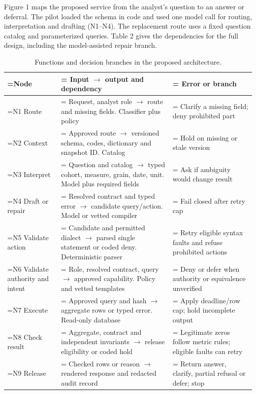 \documentclass[11pt,a4paper,onecolumn,oneside]{rho-class/rho}
\begin{document}
\label{sec:s3}

Figure 1 maps the proposed service from the analyst's question to an answer or deferral. The pilot loaded the schema in code and used one model call for routing, interpretation and drafting (N1--N4). The replacement route uses a fixed question catalog and parameterized queries. Table 2 gives the dependencies for the full design, including the model-assisted repair branch.



{\setlength{\tabcolsep}{6pt}
\renewcommand{\arraystretch}{1.35}
\begin{table}[H]
\renewcommand{\arraystretch}{1.16}
\centering
\footnotesize
\begin{tabularx}{\linewidth}{@{}>{\hsize=0.600\hsize\linewidth=\hsize\RaggedRight\arraybackslash}X>{\hsize=1.350\hsize\linewidth=\hsize\RaggedRight\arraybackslash}X>{\hsize=1.050\hsize\linewidth=\hsize\RaggedRight\arraybackslash}X@{}}
\toprule
\textbf{Node} & \textbf{Input \(\to\) output and dependency} & \textbf{Error or branch} \\ \midrule
N1 Route & Request, analyst role \(\to\) route and missing fields. Classifier plus policy & Clarify a missing field; deny prohibited part \\
N2 Context & Approved route \(\to\) versioned schema, codes, dictionary and snapshot ID. Catalog & Hold on missing or stale version \\
N3 Interpret & Question and catalog \(\to\) typed cohort, measure, grain, date, unit. Model plus required fields & Ask if ambiguity would change result \\
N4 Draft or repair & Resolved contract and typed error \(\to\) candidate query/action. Model or vetted compiler & Fail closed after retry cap \\
N5 Validate action & Candidate and permitted dialect \(\to\) parsed single statement or coded deny. Deterministic parser & Retry eligible syntax faults and refuse prohibited actions \\
N6 Validate authority and intent & Role, resolved contract, query \(\to\) approved capability. Policy and vetted templates & Deny or defer when authority or equivalence unverified \\
N7 Execute & Approved query and hash \(\to\) aggregate rows or typed error. Read-only database & Apply deadline/row cap; hold incomplete output \\
N8 Check result & Aggregate, contract and independent invariants \(\to\) release eligibility or coded hold & Legitimate zeros follow metric rules; eligible faults can retry \\
N9 Release & Checked rows or reason \(\to\) rendered response and redacted audit record & Return answer, clarify, partial refusal or defer; stop \\
\bottomrule
\end{tabularx}
\caption{Functions and decision branches in the proposed architecture.}
\end{table}
}
\end{document}
